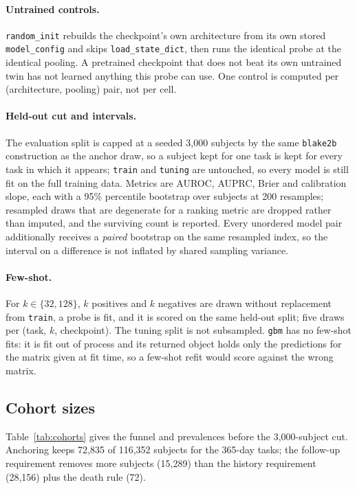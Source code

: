 \documentclass[11pt,a4paper]{article}
\newcommand{\code}[1]{\texttt{\small #1}}
\begin{document}
\paragraph{Untrained controls.}
\code{random\_init} rebuilds the checkpoint's own architecture from its own
stored \code{model\_config} and skips \code{load\_state\_dict}, then runs the
identical probe at the identical pooling. A pretrained checkpoint that does not
beat its own untrained twin has not learned anything this probe can use. One
control is computed per (architecture, pooling) pair, not per cell.

\paragraph{Held-out cut and intervals.}
The evaluation split is capped at a seeded 3{,}000 subjects by the same
\code{blake2b} construction as the anchor draw, so a subject kept for one task
is kept for every task in which it appears; \code{train} and \code{tuning} are
untouched, so every model is still fit on the full training data. Metrics are
AUROC, AUPRC, Brier and calibration slope, each with a 95\% percentile
bootstrap over subjects at 200 resamples; resampled draws that are degenerate
for a ranking metric are dropped rather than imputed, and the surviving count is
reported. Every unordered model pair additionally receives a \emph{paired}
bootstrap on the same resampled index, so the interval on a difference is not
inflated by shared sampling variance.

\paragraph{Few-shot.}
For $k \in \{32, 128\}$, $k$ positives and $k$ negatives are drawn without
replacement from \code{train}, a probe is fit, and it is scored on the same
held-out split; five draws per (task, $k$, checkpoint). The tuning split is not
subsampled. \code{gbm} has no few-shot fits: it is fit out of process and its
returned object holds only the predictions for the matrix given at fit time, so
a few-shot refit would score against the wrong matrix.

\subsection{Cohort sizes}

Table~\ref{tab:cohorts} gives the funnel and prevalences before the
3{,}000-subject cut. Anchoring keeps 72{,}835 of 116{,}352 subjects for the
365-day tasks; the follow-up requirement removes more subjects (15{,}289) than
the history requirement (28{,}156) plus the death rule (72).
\end{document}
